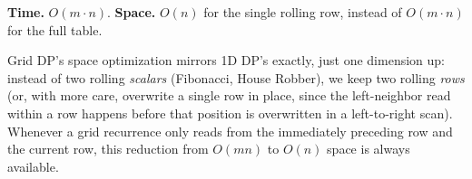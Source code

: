 \begin{complexitybox}
\textbf{Time.} $O(m \cdot n)$.
\textbf{Space.} $O(n)$ for the single rolling row, instead of
$O(m \cdot n)$ for the full table.
\end{complexitybox}

\begin{takeawaybox}
Grid DP's space optimization mirrors 1D DP's exactly, just one dimension
up: instead of two rolling \emph{scalars} (Fibonacci, House Robber), we
keep two rolling \emph{rows} (or, with more care, overwrite a single row
in place, since the left-neighbor read within a row happens before that
position is overwritten in a left-to-right scan). Whenever a grid
recurrence only reads from the immediately preceding row and the current
row, this reduction from $O(mn)$ to $O(n)$ space is always available.
\end{takeawaybox}
